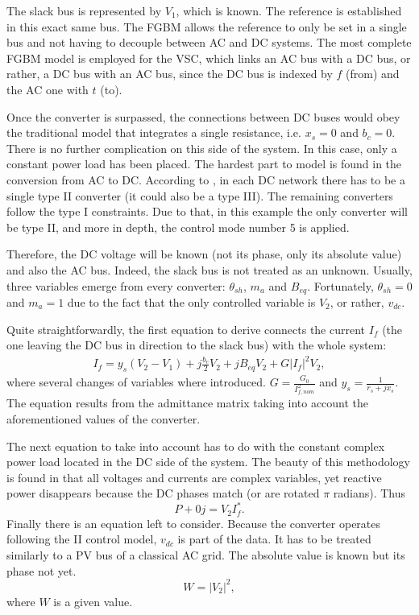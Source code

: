 \documentclass[conference]{IEEEtran}
\begin{document}
The slack bus is represented by $V_1$, which is known. The reference is established in this exact same bus. The FGBM allows the reference to only be set in a single bus and not having to decouple between AC and DC systems. The most complete FGBM model is employed for the VSC, which links an AC bus with a DC bus, or rather, a DC bus with an AC bus, since the DC bus is indexed by $f$ (from) and the AC one with $t$ (to).

Once the converter is surpassed, the connections between DC buses would obey the traditional model that integrates a single resistance, i.e. $x_s=0$ and $b_c=0$. There is no further complication on this side of the system. In this case, only a constant power load has been placed. The hardest part to model is found in the conversion from AC to DC. According to \cite{alvarez}, in each DC network there has to be a single type II converter (it could also be a type III). The remaining converters follow the type I constraints. Due to that, in this example the only converter will be type II, and more in depth, the control mode number 5 is applied.

Therefore, the DC voltage will be known (not its phase, only its absolute value) and also the AC bus. Indeed, the slack bus is not treated as an unknown. Usually, three variables emerge from every converter: $\theta_{sh}$, $m_a$ and $B_{eq}$. Fortunately, $\theta_{sh}=0$ and $m_a=1$ due to the fact that the only controlled variable is $V_2$, or rather, $v_{dc}$.

Quite straightforwardly, the first equation to derive connects the current $I_f$ (the one leaving the DC bus in direction to the slack bus) with the whole system:
\begin{equation}
  \begin{split}
    I_f = y_s(V_2 - V_1) + j \frac{b_c}{2}V_2 + jB_{eq}V_2 + G|I_f|^2V_2,
  \end{split}
  \label{eq:int1}
\end{equation}
where several changes of variables where introduced. $G = \frac{G_0}{I^2_{f,nom}}$ and $y_s=\frac{1}{r_s+jx_s}$. The equation results from the admittance matrix taking into account the aforementioned values of the converter.

The next equation to take into account has to do with the constant complex power load located in the DC side of the system. The beauty of this methodology is found in that all voltages and currents are complex variables, yet reactive power disappears because the DC phases match (or are rotated $\pi$ radians). Thus
\begin{equation}
  P + 0j = V_2 I^*_f.
  \label{eq:p1}
\end{equation}
Finally there is an equation left to consider. Because the converter operates following the II control model, $v_{dc}$ is part of the data. It has to be treated similarly to a PV bus of a classical AC grid. The absolute value is known but its phase not yet. 
\begin{equation}
  W = |V_2|^2,
  \label{eq:vabs1}
\end{equation}
where $W$ is a given value. 
\end{document}
